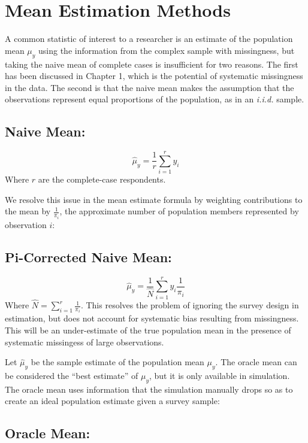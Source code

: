 \documentclass[12pt,twoside]{reedthesis}
\begin{document}
\section{Mean Estimation Methods}\label{mean-estimation-methods}

A common statistic of interest to a researcher is an estimate of the
population mean \(\mu_y\) using the information from the complex sample
with missingness, but taking the naive mean of complete cases is
insufficient for two reasons. The first has been discussed in Chapter 1,
which is the potential of systematic missingness in the data. The second
is that the naive mean makes the assumption that the observations
represent equal proportions of the population, as in an \emph{i.i.d.}
sample.

\subsection{Naive Mean:}\label{naive-mean}

\[
\hat \mu_y = \frac{1}{r} \sum_{i=1}^r y_i
\] Where \(r\) are the complete-case respondents.

We resolve this issue in the mean estimate formula by weighting
contributions to the mean by \(\frac{1}{\pi_i}\), the approximate number
of population members represented by observation \(i\):

\subsection{Pi-Corrected Naive Mean:}\label{pi-corrected-naive-mean}

\[
\hat \mu_y = \frac{1}{\hat N} \sum_{i=1}^r y_i \frac{1}{\pi_i}
\] Where \(\hat N = \sum_{i=1}^r \frac{1}{\pi_i}\). This resolves the
problem of ignoring the survey design in estimation, but does not
account for systematic bias resulting from missingness. This will be an
under-estimate of the true population mean in the presence of systematic
missingess of large observations.

Let \(\hat \mu_y\) be the sample estimate of the population mean
\(\mu_y\). The oracle mean can be considered the ``best estimate'' of
\(\mu_y\), but it is only available in simulation. The oracle mean uses
information that the simulation manually drops so as to create an ideal
population estimate given a survey sample:

\subsection{Oracle Mean:}\label{oracle-mean}
\end{document}
